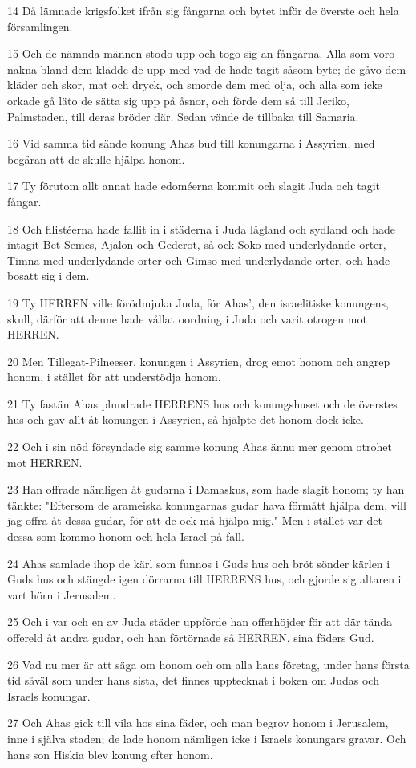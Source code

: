 \par 14 Då lämnade krigsfolket ifrån sig fångarna och bytet inför de överste och hela församlingen.
\par 15 Och de nämnda männen stodo upp och togo sig an fångarna. Alla som voro nakna bland dem klädde de upp med vad de hade tagit såsom byte; de gåvo dem kläder och skor, mat och dryck, och smorde dem med olja, och alla som icke orkade gå läto de sätta sig upp på åsnor, och förde dem så till Jeriko, Palmstaden, till deras bröder där. Sedan vände de tillbaka till Samaria.
\par 16 Vid samma tid sände konung Ahas bud till konungarna i Assyrien, med begäran att de skulle hjälpa honom.
\par 17 Ty förutom allt annat hade edoméerna kommit och slagit Juda och tagit fångar.
\par 18 Och filistéerna hade fallit in i städerna i Juda lågland och sydland och hade intagit Bet-Semes, Ajalon och Gederot, så ock Soko med underlydande orter, Timna med underlydande orter och Gimso med underlydande orter, och hade bosatt sig i dem.
\par 19 Ty HERREN ville förödmjuka Juda, för Ahas', den israelitiske konungens, skull, därför att denne hade vållat oordning i Juda och varit otrogen mot HERREN.
\par 20 Men Tillegat-Pilneeser, konungen i Assyrien, drog emot honom och angrep honom, i stället för att understödja honom.
\par 21 Ty fastän Ahas plundrade HERRENS hus och konungshuset och de överstes hus och gav allt åt konungen i Assyrien, så hjälpte det honom dock icke.
\par 22 Och i sin nöd försyndade sig samme konung Ahas ännu mer genom otrohet mot HERREN.
\par 23 Han offrade nämligen åt gudarna i Damaskus, som hade slagit honom; ty han tänkte: "Eftersom de arameiska konungarnas gudar hava förmått hjälpa dem, vill jag offra åt dessa gudar, för att de ock må hjälpa mig." Men i stället var det dessa som kommo honom och hela Israel på fall.
\par 24 Ahas samlade ihop de kärl som funnos i Guds hus och bröt sönder kärlen i Guds hus och stängde igen dörrarna till HERRENS hus, och gjorde sig altaren i vart hörn i Jerusalem.
\par 25 Och i var och en av Juda städer uppförde han offerhöjder för att där tända offereld åt andra gudar, och han förtörnade så HERREN, sina fäders Gud.
\par 26 Vad nu mer är att säga om honom och om alla hans företag, under hans första tid såväl som under hans sista, det finnes upptecknat i boken om Judas och Israels konungar.
\par 27 Och Ahas gick till vila hos sina fäder, och man begrov honom i Jerusalem, inne i själva staden; de lade honom nämligen icke i Israels konungars gravar. Och hans son Hiskia blev konung efter honom.

